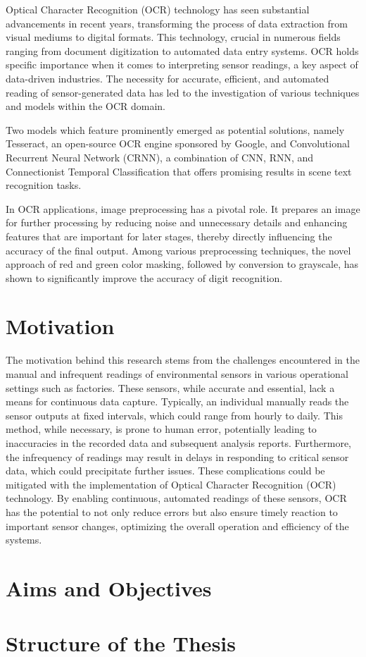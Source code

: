 Optical Character Recognition (OCR) technology has seen substantial advancements in recent years, transforming the process of data extraction from visual mediums to digital formats. This technology, crucial in numerous fields ranging from document digitization to automated data entry systems. OCR holds specific importance when it comes to interpreting sensor readings, a key aspect of data-driven industries. The necessity for accurate, efficient, and automated reading of sensor-generated data has led to the investigation of various techniques and models within the OCR domain.

Two models which feature prominently emerged as potential solutions, namely Tesseract, an open-source OCR engine sponsored by Google, and Convolutional Recurrent Neural Network (CRNN), a combination of CNN, RNN, and Connectionist Temporal Classification that offers promising results in scene text recognition tasks.

In OCR applications, image preprocessing has a pivotal role. It prepares an image for further processing by reducing noise and unnecessary details and enhancing features that are important for later stages, thereby directly influencing the accuracy of the final output. Among various preprocessing techniques, the novel approach of red and green color masking, followed by conversion to grayscale, has shown to significantly improve the accuracy of digit recognition.




\section{Motivation}


The motivation behind this research stems from the challenges encountered in the manual and infrequent readings of environmental sensors in various operational settings such as factories. These sensors, while accurate and essential, lack a means for continuous data capture. Typically, an individual manually reads the sensor outputs at fixed intervals, which could range from hourly to daily. This method, while necessary, is prone to human error, potentially leading to inaccuracies in the recorded data and subsequent analysis reports. Furthermore, the infrequency of readings may result in delays in responding to critical sensor data, which could precipitate further issues. These complications could be mitigated with the implementation of Optical Character Recognition (OCR) technology. By enabling continuous, automated readings of these sensors, OCR has the potential to not only reduce errors but also ensure timely reaction to important sensor changes, optimizing the overall operation and efficiency of the systems.

\section{Aims and Objectives}
\section{Structure of the Thesis}

